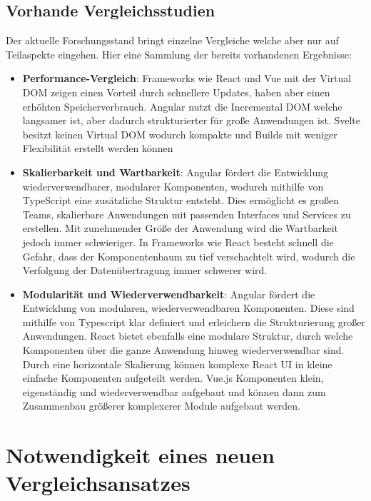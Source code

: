 \documentclass[oneside]{ausarbeitung}
\begin{document}
\subsection{Vorhande Vergleichsstudien}
Der aktuelle Forschungsstand bringt einzelne Vergleiche welche aber nur auf Teilaspekte eingehen. Hier eine Sammlung der bereits vorhandenen Ergebnisse: 
\begin{itemize}
    \item \textbf{Performance-Vergleich}: Frameworks wie React und Vue mit der Virtual DOM zeigen einen Vorteil durch schnellere Updates, haben aber einen erhöhten Speicherverbrauch. Angular nutzt die Incremental DOM welche langsamer ist, aber dadurch strukturierter für große Anwendungen ist. Svelte besitzt keinen Virtual DOM wodurch kompakte und Builds mit weniger Flexibilität erstellt werden können \parencite[S.61]{js-framework-comparison}
	\item \textbf{Skalierbarkeit und Wartbarkeit}: Angular fördert die Entwicklung wiederverwendbarer, modularer Komponenten, wodurch mithilfe von TypeScript eine zusätzliche Struktur entsteht. Dies ermöglicht es großen Teams, skalierbare Anwendungen mit passenden Interfaces und Services zu erstellen. Mit zunehmender Größe der Anwendung wird die Wartbarkeit jedoch immer schwieriger. In Frameworks wie React besteht schnell die Gefahr, dass der Komponentenbaum zu tief verschachtelt wird, wodurch die Verfolgung der Datenübertragung immer schwerer wird. \parencite[S. 25,28]{comparison-frameworks-scalable-apps}
    \item \textbf{Modularität und Wiederverwendbarkeit}: Angular fördert die Entwicklung von modularen, wiederverwendbaren Komponenten. Diese sind mithilfe von Typescript klar definiert und erleichern die Strukturierung großer Anwendungen. React bietet ebenfalls eine modulare Struktur, durch welche Komponenten über die ganze Anwendung hinweg wiederverwendbar sind. Durch eine horizontale Skalierung können komplexe React UI in kleine einfache Komponenten aufgeteilt werden. Vue.js Komponenten klein, eigenständig und wiederverwendbar aufgebaut und können dann zum Zusammenbau größerer komplexerer Module aufgebaut werden. \cite[S. 24,26] {comparison-frameworks-scalable-apps}
    
\end{itemize}

\section{Notwendigkeit eines neuen Vergleichsansatzes}
\end{document}
